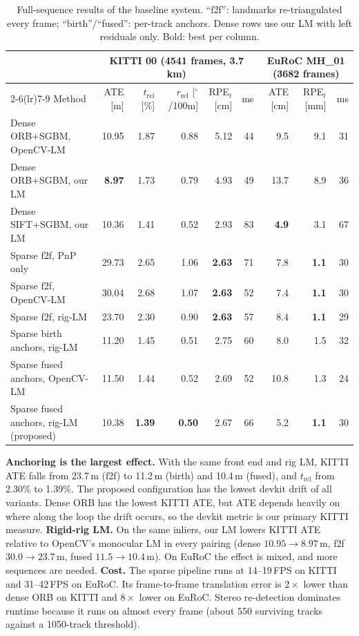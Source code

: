 \documentclass[11pt,a4paper]{article}
\begin{document}
\begin{table}[t]
\centering\scriptsize\setlength{\tabcolsep}{3.5pt}
\caption{Full-sequence results of the baseline system. ``f2f'': landmarks re-triangulated every frame; ``birth''/``fused'': per-track anchors. Dense rows use our LM with left residuals only. Bold: best per column.}\label{tab:results}
\vspace{-0.2cm}
\begin{tabular}{lrrrrr@{\hskip 10pt}rrr}
\toprule
& \multicolumn{5}{c}{KITTI 00 (4541 frames, 3.7 km)} & \multicolumn{3}{c}{EuRoC MH\_01 (3682 frames)} \\
\cmidrule(lr){2-6}\cmidrule(lr){7-9}
Method & ATE [m] & $t_\mathrm{rel}$ [\%] & $r_\mathrm{rel}$ [$^\circ$/100m] & RPE$_t$ [cm] & ms & ATE [cm] & RPE$_t$ [mm] & ms \\
\midrule
Dense ORB+SGBM, OpenCV-LM & 10.95 & 1.87 & 0.88 & 5.12 & 44 & 9.5 & 9.1 & 31 \\
Dense ORB+SGBM, our LM & \textbf{8.97} & 1.73 & 0.79 & 4.93 & 49 & 13.7 & 8.9 & 36 \\
Dense SIFT+SGBM, our LM & 10.36 & 1.41 & 0.52 & 2.93 & 83 & \textbf{4.9} & 3.1 & 67 \\
Sparse f2f, PnP only & 29.73 & 2.65 & 1.06 & \textbf{2.63} & 71 & 7.8 & \textbf{1.1} & 30 \\
Sparse f2f, OpenCV-LM & 30.04 & 2.68 & 1.07 & \textbf{2.63} & 52 & 7.4 & \textbf{1.1} & 30 \\
Sparse f2f, rig-LM & 23.70 & 2.30 & 0.90 & \textbf{2.63} & 57 & 8.4 & \textbf{1.1} & 29 \\
Sparse birth anchors, rig-LM & 11.20 & 1.45 & 0.51 & 2.75 & 60 & 8.0 & 1.5 & 32 \\
Sparse fused anchors, OpenCV-LM & 11.50 & 1.44 & 0.52 & 2.69 & 52 & 10.8 & 1.3 & 24 \\
Sparse fused anchors, rig-LM (proposed) & 10.38 & \textbf{1.39} & \textbf{0.50} & 2.67 & 66 & 5.2 & \textbf{1.1} & 30 \\
\bottomrule
\end{tabular}
\vspace{-0.35cm}
\end{table}

\textbf{Anchoring is the largest effect.} With the same front end and rig LM, KITTI ATE falls from 23.7\,m (f2f) to 11.2\,m (birth) and 10.4\,m (fused), and $t_\mathrm{rel}$ from 2.30\% to 1.39\%. The proposed configuration has the lowest devkit drift of all variants. Dense ORB has the lowest KITTI ATE, but ATE depends heavily on where along the loop the drift occurs, so the devkit metric is our primary KITTI measure. \textbf{Rigid-rig LM.} On the same inliers, our LM lowers KITTI ATE relative to OpenCV's monocular LM in every pairing (dense $10.95\!\to\!8.97$\,m, f2f $30.0\!\to\!23.7$\,m, fused $11.5\!\to\!10.4$\,m). On EuRoC the effect is mixed, and more sequences are needed. \textbf{Cost.} The sparse pipeline runs at 14--19\,FPS on KITTI and 31--42\,FPS on EuRoC. Its frame-to-frame translation error is $2\times$ lower than dense ORB on KITTI and $8\times$ lower on EuRoC. Stereo re-detection dominates runtime because it runs on almost every frame (about 550 surviving tracks against a 1050-track threshold).
\end{document}
